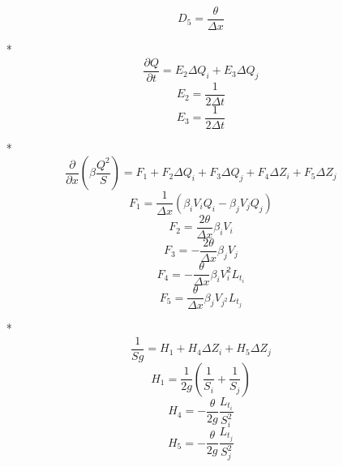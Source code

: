 \begin{itemize}
\begin{equation}
    D_5 = \frac{\theta}{\Delta x}
  \end{equation}
 \item[*]
   \begin{equation}
     \frac{\partial Q}{\partial t} = E_2 \Delta Q_i + E_3 \Delta Q_j
   \end{equation}
   \begin{equation}
     E_2 = \frac{1}{2 \Delta t}
   \end{equation}
   \begin{equation}
     E_3 = \frac{1}{2 \Delta t}
   \end{equation}
 \item[*]
   \begin{equation}
    \frac{\partial}{\partial x} \left ( \beta \frac{Q^2}{S} \right ) = F_1 + F_2 \Delta Q_i + F_3 \Delta Q_j + F_4 \Delta Z_i + F_5 \Delta Z_j
   \end{equation}
   \begin{equation}
     F_1 = \frac{1}{\Delta x} ( \beta_i V_i Q_i - \beta_j V_j Q_j )
   \end{equation}
   \begin{equation}
     F_2 = \frac{2 \theta}{\Delta x} \beta_i V_i
   \end{equation}
   \begin{equation}
     F_3 = -\frac{2 \theta}{\Delta x} \beta_j V_j
   \end{equation}
   \begin{equation}
     F_4 = - \frac{\theta}{\Delta x} \beta_i V_{i}^2 L_{t_i}
   \end{equation}
   \begin{equation}
     F_5 = \frac{\theta}{\Delta x} \beta_j V_{j^2} L_{t_j}
   \end{equation}
 \item[*]
   \begin{equation}
    \frac{1}{S g} = H_1 + H_4 \Delta Z_i + H_5 \Delta Z_j
   \end{equation}
   \begin{equation}
     H_1 = \frac{1}{2 g} \left ( \frac{1}{S_i} + \frac{1}{S_j} \right )
   \end{equation}
   \begin{equation}
     H_4 = - \frac{\theta}{2 g} \frac{L_{t_i}}{S_{i}^2}
   \end{equation}
   \begin{equation}
     H_5 = - \frac{\theta}{2 g} \frac{L_{t_j}}{S_{j}^2}
   \end{equation}
\end{itemize}

